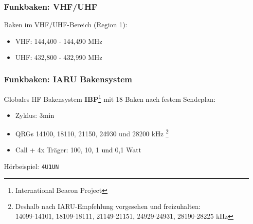\begin{frame}
    \frametitle{Funkbaken: VHF/UHF}

    Baken im VHF/UHF-Bereich (Region 1):

    \begin{itemize}
        \item VHF: 144,400 - 144,490 MHz
        \item UHF: 432,800 - 432,990 MHz
    \end{itemize}

\end{frame}

\begin{frame}
    \frametitle{Funkbaken: IARU Bakensystem}

    Globales HF Bakensystem \textbf{IBP}\footnote{International Beacon Project}
    mit 18 Baken nach festem Sendeplan:

    \begin{itemize}
        \item Zyklus: 3min
        \item QRGs 14100, 18110, 21150, 24930 und 28200 kHz
              \footnote{Deshalb nach IARU-Empfehlung vorgesehen und freizuhalten: \\
              \scriptsize 14099-14101, 18109-18111, 21149-21151, 24929-24931, 28190-28225 kHz}
        \item Call + 4x Träger: 100, 10, 1 und 0,1 Watt
    \end{itemize}

    \begin{center}
        Hörbeispiel: \Large \texttt{4U1UN} \hyperlink{refs}{\cite{ibp}}
    \end{center}

\end{frame}

